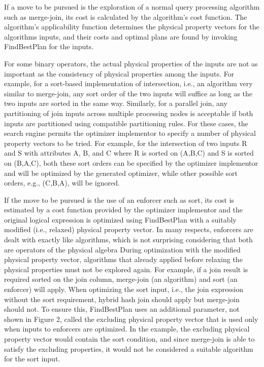 \documentclass[a4paper,12pt,notitlepage,twoside,openright]{article}
\begin{document}
If a move to be pursued is the exploration of a normal query processing
algorithm such as merge-join, its cost is calculated by the algorithm's
cost function. The algorithm's applicability function determines the
physical property vectors for the algorithms inputs, and their costs and
optimal plans are found by invoking FindBestPlan for the inputs.

For some binary operators, the actual physical properties of the inputs
are not as important as the consistency of physical properties among the
inputs. For example, for a sort-based implementation of intersection,
i.e., an algorithm very similar to merge-join, any sort order of the two
inputs will suffice as long as the two inputs are sorted in the same
way. Similarly, for a parallel join, any partitioning of join inputs
across multiple processing nodes is acceptable if both inputs are
partitioned using compatible partitioning rules. For these cases, the
search engine permits the optimizer implementor to specify a number of
physical property vectors to be tried. For example, for the intersection
of two inputs R and S with attributes A, B, and C where R is sorted on
(A,B,C) and S is sorted on (B,A,C), both these sort orders can be
specified by the optimizer implementor and will be optimized by the
generated optimizer, while other possible sort orders, e.g., (C,B,A),
will be ignored.

If the move to be pursued is the use of an enforcer such as sort, its
cost is estimated by a cost function provided by the optimizer
implementor and the original logical expression is optimized using
FindBestPlan with a suitably modified (i.e., relaxed) physical property
vector. In many respects, enforcers are dealt with exactly like
algorithms, which is not surprising considering that both are operators
of the physical algebra During optimization with the modified physical
property vector, algorithms that already applied before relaxing the
physical properties must not be explored again. For example, if a join
result is required sorted on the join column, merge-join (an algorithm)
and sort (an enforcer) will apply. When optimizing the sort input, i.e.,
the join expression without the sort requirement, hybrid hash join
should apply but merge-join should not. To ensure this, FindBestPlan
uses an additional parameter, not shown in Figure 2, called the
excluding physical property vector that is used only when inputs to
enforcers are optimized. In the example, the excluding physical property
vector would contain the sort condition, and since merge-join is able to
satisfy the excluding properties, it would not be considered a suitable
algorithm for the sort input.
\end{document}

